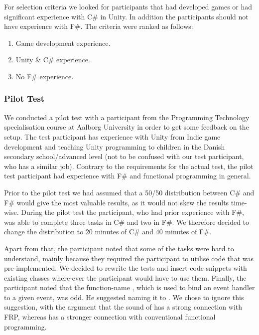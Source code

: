For selection criteria we looked for participants that had developed games or had significant experience with C\# in Unity. In addition the participants should not have experience with F\#. The criteria were ranked as follows:
\begin{enumerate}
	\item Game development experience.
	\item Unity \& C\# experience.
	\item No F\# experience.
\end{enumerate}

\subsubsection{Pilot Test}
We conducted a pilot test with a participant from the Programming Technology specialisation course at Aalborg University in order to get some feedback on the setup. The test participant has experience with Unity from Indie game development and teaching Unity programming to children in the Danish secondary school/advanced level (not to be confused with our test participant, who has a similar job). Contrary to the requirements for the actual test, the pilot test participant had experience with F\# and functional programming in general.

Prior to the pilot test we had assumed that a 50/50 distribution between C\# and F\# would give the most valuable results, as it would not skew the results time-wise. During the pilot test the participant, who had prior experience with F\#, was able to complete three tasks in C\# and two in F\#. We therefore decided to change the distribution to 20 minutes of C\# and 40 minutes of F\#.

Apart from that, the participant noted that some of the tasks were hard to understand, mainly because they required the participant to utilise code that was pre-implemented. We decided to rewrite the tests and insert code snippets with existing classes where-ever the participant would have to use them. Finally, the participant noted that the function-name , which is used to bind an event handler to a given event, was odd. He suggested naming it to . We chose to ignore this suggestion, with the argument that the sound of  has a strong connection with \gls{FRP}, whereas  has a stronger connection with conventional functional programming.
